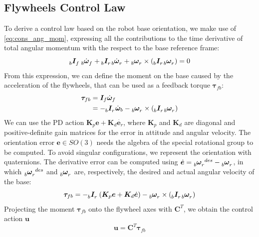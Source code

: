\documentclass[letterpaper, 10 pt, conference]{ieeeconf}      %
\begin{document}
\subsection{Flywheels Control Law}
\label{subsec:control_law}
To derive a control law based on the robot base orientation, we make use of \eqref{eq:cons_ang_mom}, expressing all the contributions to the time derivative of total angular momentum with the respect to the base reference frame:
\begin{equation*}
\tensor[_b]{\bm{I}}{_f} \, \tensor[_b]{\dot{\bm{\omega}}}{_f} + \tensor[_b]{\bm{I}}{_r} \tensor[_b]{\dot{\bm{\omega}}}{_r} + \tensor[_b]{\bm{\omega}}{_r} \times \left( \tensor[_b]{\bm{I}}{_r} \tensor[_b]{\bm{\omega}}{_r}\right) = 0
\end{equation*}
From this expression, we can define the moment on the base caused by the acceleration of the flywheels, that can be used as a feedback torque $\bm{\tau}_{fb}$:
\begin{equation*}
\begin{split}
\bm{\tau}_{fb} &= \bm{I}_f \dot{\bm{\omega}}_f \\
&= - \tensor[_b]{\bm{I}}{_r} \dot{\bm{\omega}}_b - \tensor[_b]{\bm{\omega}}{_r} \times \left( \tensor[_b]{\bm{I}}{_r} \tensor[_b]{\bm{\omega}}{_r}\right)
\end{split}
\end{equation*}
We can use the PD action $\bm{K}_p \bm{e} + \bm{K}_d \dot{\bm{e}_r}$, where $\bm{K}_p$ and $\bm{K}_d$ are diagonal and positive-definite gain matrices for the error in attitude and angular velocity.
The orientation error $\bm{e} \in SO(3)$ needs the algebra of the special rotational group to be computed. To avoid singular configurations, we represent the orientation with quaternions.
The derivative error can be computed using $\dot{\bm{e}} = \tensor[_b]{\bm{\omega}}{_r^{des}} - \tensor[_b]{\bm{\omega}}{_r}$, in which $\tensor[_b]{\bm{\omega}}{_r^{des}}$ and $\tensor[_b]{\bm{\omega}}{_r}$ are, respectively, the desired and actual angular velocity of the base:
\begin{equation*}
\bm{\tau}_{fb} = - \tensor[_b]{\bm{I}}{_r} \left(\bm{K}_p \bm{e} + \bm{K}_d \dot{\bm{e}}\right) - \tensor[_b]{\bm{\omega}}{_r} \times \left( \tensor[_b]{\bm{I}}{_r} \tensor[_b]{\bm{\omega}}{_r}\right)
\end{equation*}
Projecting the moment $\bm{\tau}_{fb}$ onto the flywheel axes with $\bm{C}^T$, we obtain the control action $\bm{u}$
\begin{equation}
\label{eq:ctrl_law}
\bm{u} = \bm{C}^T \bm{\tau}_{fb}
\end{equation}
\end{document}
